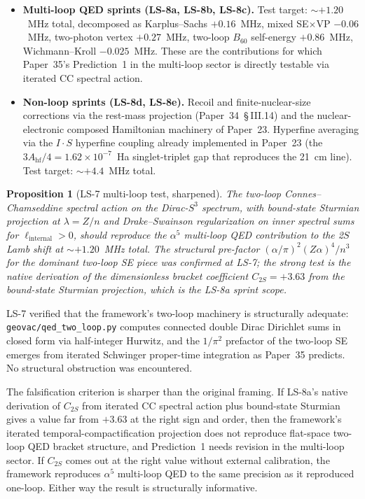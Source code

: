 \documentclass[11pt]{article}
\newtheorem{proposition}{Proposition}
\begin{document}
\begin{itemize}
\setlength\itemsep{0pt}
\item \textbf{Multi-loop QED sprints (LS-8a, LS-8b, LS-8c).}  Test
target: $\sim +1.20$~MHz total, decomposed as Karplus--Sachs
$+0.16$~MHz, mixed SE$\times$VP $-0.06$~MHz, two-photon vertex
$+0.27$~MHz, two-loop $B_{60}$ self-energy $+0.86$~MHz,
Wichmann--Kroll $-0.025$~MHz.  These are the contributions for which
Paper~35's Prediction~1 in the multi-loop sector is directly testable
via iterated CC spectral action.
\item \textbf{Non-loop sprints (LS-8d, LS-8e).}  Recoil and
finite-nuclear-size corrections via the rest-mass projection
(Paper~34~\S\,III.14) and the nuclear-electronic composed Hamiltonian
machinery of Paper~23.  Hyperfine averaging via the $I \cdot S$
hyperfine coupling already implemented in Paper~23 (the $3 A_\text{hf}/4
= 1.62 \times 10^{-7}$~Ha singlet-triplet gap that reproduces the
21~cm line).  Test target: $\sim +4.4$~MHz total.
\end{itemize}

\begin{proposition}[LS-7 multi-loop test, sharpened]
\label{prop:ls7_sharpened}
The two-loop Connes--Chamseddine spectral action on the
Dirac-$S^3$ spectrum, with bound-state Sturmian projection at
$\lambda = Z/n$ and Drake--Swainson regularization on inner spectral
sums for $\ell_\text{internal} > 0$, should reproduce the
$\alpha^5$ multi-loop QED contribution to the 2$S$ Lamb shift at
$\sim +1.20$~MHz total.  The structural pre-factor
$(\alpha/\pi)^2 (Z\alpha)^4 / n^3$ for the dominant two-loop SE
piece was confirmed at LS-7; the strong test is the native derivation
of the dimensionless bracket coefficient $C_{2S} = +3.63$ from the
bound-state Sturmian projection, which is the LS-8a sprint scope.
\end{proposition}

LS-7 verified that the framework's two-loop machinery is structurally
adequate: \texttt{geovac/qed\_two\_loop.py} computes connected double
Dirac Dirichlet sums in closed form via half-integer Hurwitz, and
the $1/\pi^2$ prefactor of the two-loop SE emerges from iterated
Schwinger proper-time integration as Paper~35 predicts.  No
structural obstruction was encountered.

The falsification criterion is sharper than the original framing.
If LS-8a's native derivation of $C_{2S}$ from iterated CC spectral
action plus bound-state Sturmian gives a value far from $+3.63$ at
the right sign and order, then the framework's iterated
temporal-compactification projection does not reproduce flat-space
two-loop QED bracket structure, and Prediction~1 needs revision in
the multi-loop sector.  If $C_{2S}$ comes out at the right value
without external calibration, the framework reproduces $\alpha^5$
multi-loop QED to the same precision as it reproduced one-loop.
Either way the result is structurally informative.
\end{document}
